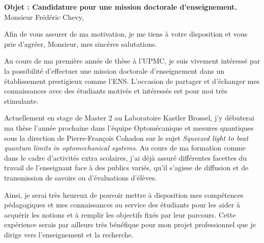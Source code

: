\documentclass[11pt,a4paper]{moderncv}
\begin{document}
\clearpage

\date{} %
\opening{\textbf{Objet : Candidature pour une mission doctorale d'enseignement.} \\ \bigskip \bigskip \bigskip \bigskip \bigskip
 Monsieur Frédéric Chevy,} %
\closing{Afin de vous assurer de ma motivation, je me tiens à votre disposition et vous prie d'agréer, Monsieur, mes sincères salutations.}
\makelettertitle %

\setlength\rightskip{-\leftskip}

Au cours de ma première année de thèse à l'UPMC, je suis vivement intéressé par la possibilité d'effectuer une mission doctorale d'enseignement dans un établissement prestigieux comme l'ENS. L'occasion de partager et d'échanger mes connaissances avec des étudiants motivés et intéressés est pour moi très stimulante. 

Actuellement en stage de Master 2 au Laboratoire Kastler Brossel, j'y débuterai ma thèse l'année prochaine dans l'équipe Optomécanique et mesures quantiques sous la direction de Pierre-François Cohadon sur le sujet \emph{Squeezed light to beat quantum limits in optomechanical systems}. Au cours de ma formation comme dans le cadre d'activités extra scolaires, j'ai déjà assuré différentes facettes du travail de l'enseignant face à des publics variés, qu'il s'agisse de diffusion et de transmission de savoirs ou d'évaluations d'élèves.

Ainsi, je serai très heureux de pouvoir mettre à disposition mes compétences pédagogiques et mes connaissances au service des étudiants pour les aider à acquérir les notions et à remplir les objectifs fixés par leur parcours. Cette expérience serais par ailleurs très bénéfique pour mon projet professionnel que je dirige vers l'enseignement et la recherche.

\makeletterclosing %
\end{document}
